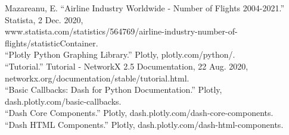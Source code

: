 \documentclass[fontsize=11pt]{article}
\begin{document}
Mazareanu, E. “Airline Industry Worldwide - Number of Flights 2004-2021.” Statista, 2 Dec. 2020, \\ www.statista.com/statistics/564769/airline-industry-number-of-flights/statisticContainer. \\

“Plotly Python Graphing Library.” Plotly, plotly.com/python/. \\
“Tutorial.” Tutorial - NetworkX 2.5 Documentation, 22 Aug. 2020, \\ networkx.org/documentation/stable/tutorial.html. \\

“Basic Callbacks: Dash for Python Documentation.” Plotly, dash.plotly.com/basic-callbacks. \\

“Dash Core Components.” Plotly, dash.plotly.com/dash-core-components. \\

“Dash HTML Components.” Plotly, dash.plotly.com/dash-html-components. \\
\end{document}
